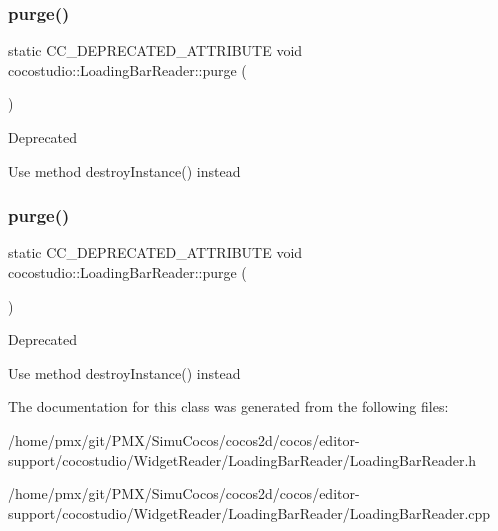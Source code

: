 \subsubsection{\texorpdfstring{purge()}{purge()}\hspace{0.1cm}{\footnotesize\ttfamily [1/2]}}
{\footnotesize\ttfamily static C\+C\+\_\+\+D\+E\+P\+R\+E\+C\+A\+T\+E\+D\+\_\+\+A\+T\+T\+R\+I\+B\+U\+TE void cocostudio\+::\+Loading\+Bar\+Reader\+::purge (\begin{DoxyParamCaption}{ }\end{DoxyParamCaption})\hspace{0.3cm}{\ttfamily [static]}}

\begin{DoxyRefDesc}{Deprecated}
\item[\hyperlink{deprecated__deprecated000093}{Deprecated}]Use method destroy\+Instance() instead \end{DoxyRefDesc}
\mbox{\label{classcocostudio_1_1LoadingBarReader_a6a6b46011bdf6cfb6d8e63a55bd9afa7}} 
\subsubsection{\texorpdfstring{purge()}{purge()}\hspace{0.1cm}{\footnotesize\ttfamily [2/2]}}
{\footnotesize\ttfamily static C\+C\+\_\+\+D\+E\+P\+R\+E\+C\+A\+T\+E\+D\+\_\+\+A\+T\+T\+R\+I\+B\+U\+TE void cocostudio\+::\+Loading\+Bar\+Reader\+::purge (\begin{DoxyParamCaption}{ }\end{DoxyParamCaption})\hspace{0.3cm}{\ttfamily [static]}}

\begin{DoxyRefDesc}{Deprecated}
\item[\hyperlink{deprecated__deprecated000328}{Deprecated}]Use method destroy\+Instance() instead \end{DoxyRefDesc}


The documentation for this class was generated from the following files\+:\begin{DoxyCompactItemize}
\item 
/home/pmx/git/\+P\+M\+X/\+Simu\+Cocos/cocos2d/cocos/editor-\/support/cocostudio/\+Widget\+Reader/\+Loading\+Bar\+Reader/Loading\+Bar\+Reader.\+h\item 
/home/pmx/git/\+P\+M\+X/\+Simu\+Cocos/cocos2d/cocos/editor-\/support/cocostudio/\+Widget\+Reader/\+Loading\+Bar\+Reader/Loading\+Bar\+Reader.\+cpp\end{DoxyCompactItemize}
